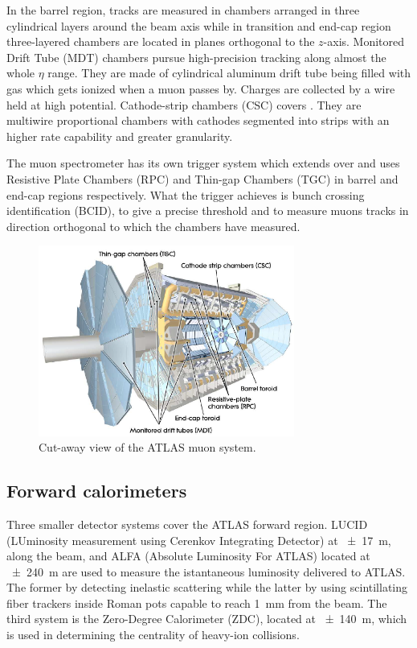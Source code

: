 In the barrel region, tracks are measured in chambers arranged in three cylindrical layers around the beam axis while in transition and end-cap region three-layered chambers are located in planes orthogonal to the $z$-axis. Monitored Drift Tube (MDT) chambers pursue high-precision tracking along almost the whole $\eta$ range. They are made of cylindrical aluminum drift tube being filled with gas which gets ionized when a muon passes by. Charges are collected by a wire held at high potential. Cathode-strip chambers (CSC) covers . They are multiwire proportional chambers with cathodes segmented into strips with an higher rate capability and greater granularity.

The muon spectrometer has its own trigger system which extends over  and uses Resistive Plate Chambers (RPC) and Thin-gap Chambers (TGC) in barrel and end-cap regions respectively. What the trigger achieves is bunch crossing identification (BCID), to give a precise \pt threshold and to measure muons tracks in direction orthogonal to which the chambers have measured.

\begin{figure}[pt]
\centering
\includegraphics[width=0.75\textwidth]{LHC_ATLAS/Muons}
\caption{Cut-away view of the ATLAS muon system.}
\label{fig:muons}
\end{figure}



\subsection{Forward calorimeters}
Three smaller detector systems cover the ATLAS forward region. LUCID (LUminosity measurement using Cerenkov Integrating Detector) at \SI{\pm 17}{m}, along the beam, and ALFA (Absolute Luminosity For ATLAS) located at \SI{\pm 240}{m} are used to measure the istantaneous luminosity delivered to ATLAS. The former by detecting inelastic \pp scattering while the latter by using scintillating fiber trackers inside Roman pots capable to reach \SI{1}{mm} from the beam. The third system is the Zero-Degree Calorimeter (ZDC), located at \SI{\pm 140}{m}, which is used in determining the centrality of heavy-ion collisions.


